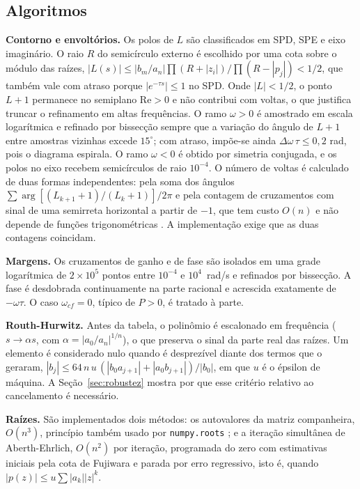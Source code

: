 \documentclass[12pt]{article}
\begin{document}
\subsection{Algoritmos}

\textbf{Contorno e envoltórios.} Os polos de $L$ são classificados em SPD, SPE e eixo imaginário. O raio $R$ do semicírculo externo é escolhido por uma cota sobre o módulo das raízes, $|L(s)|\le |b_m/a_n|\prod(R+|z_i|)/\prod(R-|p_j|) < 1/2$, que também vale com atraso porque $|e^{-\tau s}|\le 1$ no SPD. Onde $|L|<1/2$, o ponto $L+1$ permanece no semiplano $\mathrm{Re}>0$ e não contribui com voltas, o que justifica truncar o refinamento em altas frequências. O ramo $\omega>0$ é amostrado em escala logarítmica e refinado por bissecção sempre que a variação do ângulo de $L+1$ entre amostras vizinhas excede $15^\circ$; com atraso, impõe-se ainda $\Delta\omega\,\tau\le 0{,}2$ rad, pois o diagrama espirala. O ramo $\omega<0$ é obtido por simetria conjugada, e os polos no eixo recebem semicírculos de raio $10^{-4}$. O número de voltas é calculado de duas formas independentes: pela soma dos ângulos $\sum \arg[(L_{k+1}+1)/(L_k+1)]/2\pi$ e pela contagem de cruzamentos com sinal de uma semirreta horizontal a partir de $-1$, que tem custo $O(n)$ e não depende de funções trigonométricas \cite{hormann2001}. A implementação exige que as duas contagens coincidam.

\textbf{Margens.} Os cruzamentos de ganho e de fase são isolados em uma grade logarítmica de $2\times 10^5$ pontos entre $10^{-4}$ e $10^4$~rad/s e refinados por bissecção. A fase é desdobrada continuamente na parte racional e acrescida exatamente de $-\omega\tau$. O caso $\omega_{cf}=0$, típico de $P>0$, é tratado à parte.

\textbf{Routh-Hurwitz.} Antes da tabela, o polinômio é escalonado em frequência ($s\to\alpha s$, com $\alpha=|a_0/a_n|^{1/n}$), o que preserva o sinal da parte real das raízes. Um elemento é considerado nulo quando é desprezível diante dos termos que o geraram, $|b_j|\le 64\,n\,u\,(|b_0a_{j+1}|+|a_0b_{j+1}|)/|b_0|$, em que $u$ é o épsilon de máquina. A Seção~\ref{sec:robustez} mostra por que esse critério relativo ao cancelamento é necessário.

\textbf{Raízes.} São implementados dois métodos: os autovalores da matriz companheira, $O(n^3)$, princípio também usado por \texttt{numpy.roots} \cite{edelman1995}; e a iteração simultânea de Aberth-Ehrlich, $O(n^2)$ por iteração, programada do zero com estimativas iniciais pela cota de Fujiwara e parada por erro regressivo, isto é, quando $|p(z)|\le u\sum|a_k||z|^k$.
\end{document}
